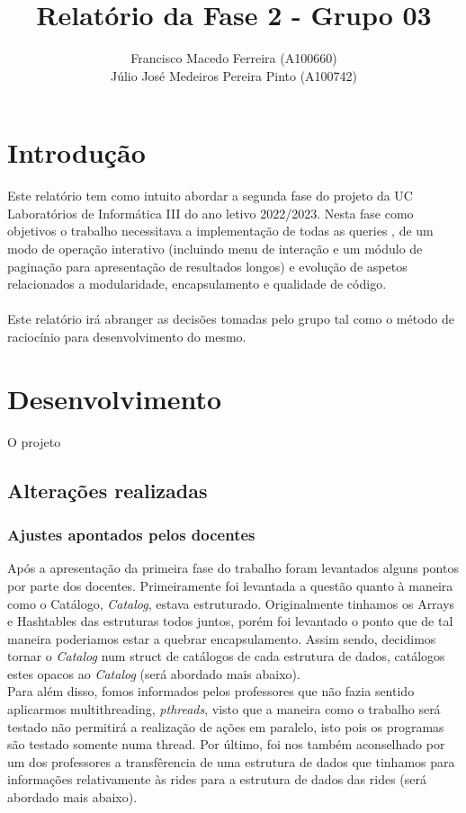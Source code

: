 \documentclass{article}
\title{Relatório da Fase 2 - Grupo 03}
\author{Francisco Macedo Ferreira (A100660)\\Júlio José Medeiros Pereira Pinto (A100742)}
\begin{document}
  
    \maketitle
    
    \section{Introdução}
    Este relatório tem como intuito abordar a segunda fase do projeto da UC Laboratórios 
    de Informática III do ano letivo 2022/2023.
    Nesta fase como objetivos o trabalho necessitava a implementação de todas as queries
    , de um modo de operação interativo (incluindo menu de interação e um módulo de 
    paginação para apresentação de resultados longos) e evolução de aspetos relacionados
    a modularidade, encapsulamento e qualidade de código.
    \\
    \\Este relatório irá abranger as decisões tomadas pelo grupo tal como o método de 
    raciocínio para desenvolvimento do mesmo.
    
    \section{Desenvolvimento}
    O projeto 
    \subsection{Alterações realizadas}
        \subsubsection{Ajustes apontados pelos docentes}
            Após a apresentação da primeira fase do trabalho foram levantados
            alguns pontos por parte dos docentes. Primeiramente foi levantada
            a questão quanto à maneira como o Catálogo, \emph{Catalog}, estava
            estruturado. Originalmente tinhamos os Arrays e Hashtables das 
            estruturas todos juntos, porém foi levantado o ponto que de tal 
            maneira poderiamos estar a quebrar encapsulamento. Assim sendo, 
            decidimos tornar o \emph{Catalog} num struct de catálogos de cada 
            estrutura de dados, catálogos estes opacos ao \emph{Catalog} 
            (será abordado mais abaixo).\\Para além disso, fomos informados 
            pelos professores que não fazia sentido aplicarmos multithreading, 
            \emph{pthreads}, visto que a maneira como o trabalho será testado 
            não permitirá a realização de ações em paralelo, isto pois os 
            programas são testado somente numa thread. Por último, foi nos 
            também aconselhado por um dos professores a transfêrencia de 
            uma estrutura de dados que tinhamos para informações relativamente 
            às rides para a estrutura de dados das rides (será abordado mais 
            abaixo).
\end{document}
